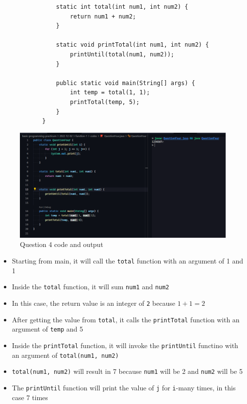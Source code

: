 \documentclass[12pt,titlepage]{article}
\begin{document}
\begin{enumerate}
{\begin{verbatim}
                static int total(int num1, int num2) {
                    return num1 + num2;
                }

                static void printTotal(int num1, int num2) {
                    printUntil(total(num1, num2));
                }

                public static void main(String[] args) {
                    int temp = total(1, 1);
                    printTotal(temp, 5);
                }
            }
        \end{verbatim}

        \begin{figure}[h]
            \centering
            \includegraphics[width=.8\textwidth]{./images/question-four.png}
            \caption{Question 4 code and output}
        \end{figure}

        \begin{itemize}
            \item Starting from main, it will call the \texttt{total} function with an argument of 1 and 1
            \item Inside the \texttt{total} function, it will sum \texttt{num1} and \texttt{num2}
            \item In this case, the return value is an integer of \texttt{2} because $1 + 1 = 2$
            \item After getting the value from \texttt{total}, it calls the \texttt{printTotal} function with an argument of \texttt{temp} and 5
            \item Inside the \texttt{printTotal} function, it will invoke the \texttt{printUntil} functino with an argument of \texttt{total(num1, num2)}
            \item \texttt{total(num1, num2)} will result in 7 because \texttt{num1} will be 2 and \texttt{num2} will be 5
            \item The \texttt{printUntil} function will print the value of \texttt{j} for \texttt{i}-many times, in this case 7 times
        \end{itemize}
    }
\end{enumerate}
\end{document}
